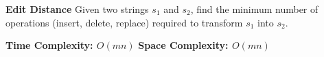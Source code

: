 \textbf{Edit Distance}
Given two strings $s_1$ and $s_2$, find the minimum number of operations (insert, delete, replace) required to transform $s_1$ into $s_2$.

\textbf{Time Complexity: $O(mn)$}
\textbf{Space Complexity: $O(mn)$}

